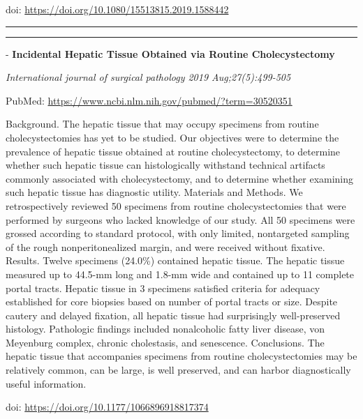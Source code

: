 \documentclass[]{article}
\begin{document}
doi: \url{https://doi.org/10.1080/15513815.2019.1588442}

{}

{}

\begin{center}\rule{0.5\linewidth}{\linethickness}\end{center}

\begin{center}\rule{0.5\linewidth}{\linethickness}\end{center}

 - \textbf{Incidental Hepatic Tissue Obtained via Routine
Cholecystectomy}

\emph{International journal of surgical pathology 2019
Aug;27(5):499-505}

PubMed: \url{https://www.ncbi.nlm.nih.gov/pubmed/?term=30520351}

Background. The hepatic tissue that may occupy specimens from routine
cholecystectomies has yet to be studied. Our objectives were to
determine the prevalence of hepatic tissue obtained at routine
cholecystectomy, to determine whether such hepatic tissue can
histologically withstand technical artifacts commonly associated with
cholecystectomy, and to determine whether examining such hepatic tissue
has diagnostic utility. Materials and Methods. We retrospectively
reviewed 50 specimens from routine cholecystectomies that were performed
by surgeons who lacked knowledge of our study. All 50 specimens were
grossed according to standard protocol, with only limited, nontargeted
sampling of the rough nonperitonealized margin, and were received
without fixative. Results. Twelve specimens (24.0\%) contained hepatic
tissue. The hepatic tissue measured up to 44.5-mm long and 1.8-mm wide
and contained up to 11 complete portal tracts. Hepatic tissue in 3
specimens satisfied criteria for adequacy established for core biopsies
based on number of portal tracts or size. Despite cautery and delayed
fixation, all hepatic tissue had surprisingly well-preserved histology.
Pathologic findings included nonalcoholic fatty liver disease, von
Meyenburg complex, chronic cholestasis, and senescence. Conclusions. The
hepatic tissue that accompanies specimens from routine cholecystectomies
may be relatively common, can be large, is well preserved, and can
harbor diagnostically useful information.

doi: \url{https://doi.org/10.1177/1066896918817374}

{}

{}
\end{document}
